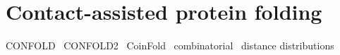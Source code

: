 \section{Contact-assisted protein folding}

CONFOLD~\cite{adhikari2015confold}
CONFOLD2~\cite{adhikari2018confold2}
CoinFold~\cite{wang2016coinfold}
combinatorial~\cite{chelvanayagam1998combinatorial}
distance distributions~\cite{reese1996distance}